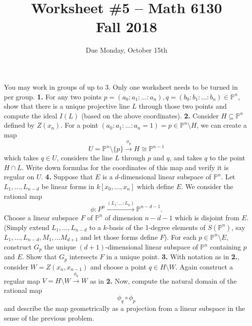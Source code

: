 \documentclass[11pt]{amsart}
\theoremstyle{theorem}
\newcommand{\bP}{\mathbb{P}}
\begin{document}
\title{Worksheet \#5 -- Math 6130\\Fall 2018}
\author{Due Monday, October 15th}

\maketitle
You may work in groups of up to 3.  Only one worksheet needs to be turned in per group.
\vskip 9pt
\noindent
{\bf 1.}  For any two points $p = (a_0 : a_1 : \dots : a_n), q = (b_0 : b_1 : \dots :b_n) \in \bP^n$, show that there is a unique projective line $L$ through those two points and compute the ideal $I(L)$ (based on the above coordinates).  
\vskip 200pt
\noindent
{\bf 2.}  Consider $H \subseteq \bP^n$ defined by $Z(x_n)$.  For a point $(a_0 : a_1 : \dots : a_n = 1) = p \in \bP^n \setminus H$, we can create a map 
\[
U = \bP^n \setminus \{ p \} \xrightarrow{\phi_p} H \cong \bP^{n-1}
\]
which takes $q \in U$, considers the line $L$ through $p$ and $q$, and takes $q$ to the point $H \cap L$.  Write down formulas for the coordinates of this map and verify it is regular on $U$.  
\newpage
\noindent
{\bf 4.}  Suppose that $E$ is a $d$-dimensional linear subspace of $\bP^n$.  Let $L_1, \dots, L_{n-d}$ be linear forms in $k[x_0, \dots, x_n]$ which define $E$.  We consider the rational map
\[
\phi : P^n \xrightarrow{(L_1: \dots : L_n)} \bP^{n-d-1}.
\]
Choose a linear subspace $F$ of $\bP^n$ of dimension $n-d-1$ which is disjoint from $E$.  (Simply extend $L_1, \dots, L_{n-d}$ to a $k$-basis of the 1-degree elements of $S(\bP^n)$, say $L_1, \dots, L_{n-d}, M_1, \dots M_{d+1}$ and let those forms define $F$).
For each $p \in \bP^n \setminus E$, construct $G_p$ the unique $(d+1)$-dimensional linear subspace of $\bP^n$ containing $p$ and $E$.  Show that $G_p$ intersects $F$ in a unique point.
\vskip 230pt
\noindent
{\bf 3.}  With notation as in {\bf 2.}, consider $W = Z(x_n, x_{n-1})$ and choose a point $q \in H \setminus W$.  Again construct a regular map $V = H \setminus W \xrightarrow{\phi_q} W$ as in {\bf 2.}  Now, compute the natural domain of the rational map
\[
\phi_q \circ \phi_p
\]
and describe the map geometrically as a projection from a linear subspace in the sense of the previous problem.
\end{document}
